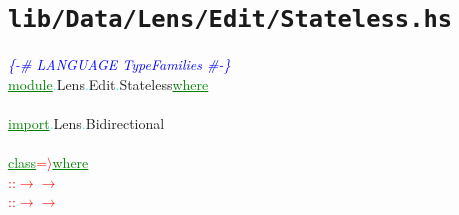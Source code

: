 \section{\texttt{lib/Data/Lens/Edit/Stateless.hs}}
\label{mod:Data.Lens.Edit.Stateless}
\textcolor{blue}{{\it{}\{-\# LANGUAGE TypeFamilies \#-\}}}\\\textcolor{green}{\underline{module}}\textcolor{cyan}{.}{\rm{}Lens}\textcolor{cyan}{.}{\rm{}Edit}\textcolor{cyan}{.}{\rm{}Stateless}\hsspace \textcolor{green}{\underline{where}}\\\\\textcolor{green}{\underline{import}}\textcolor{cyan}{.}{\rm{}Lens}\textcolor{cyan}{.}{\rm{}Bidirectional}\\\\\textcolor{green}{\underline{class}}\hsspace \textcolor{red}{=\ensuremath{\rangle}}\hsspace \textcolor{green}{\underline{where}}\\\hsspace \textcolor{red}{::}\hsspace \textcolor{red}{\ensuremath{\rightarrow}}\hsspace \textcolor{red}{\ensuremath{\rightarrow}}\\\hsspace \textcolor{red}{::}\hsspace \textcolor{red}{\ensuremath{\rightarrow}}\hsspace \textcolor{red}{\ensuremath{\rightarrow}}\\
